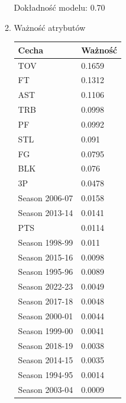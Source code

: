 \documentclass{article}
\begin{document}
\begin{enumerate}
\begin{enumerate}
        Dokładność modelu: 0.70
        \item Ważność atrybutów
        \begin{table}[H]
            \centering
            \begin{tabular}{|l|l|}
            \hline
            \textbf{Cecha} & \textbf{Ważność}  \\ \hline
            TOV & 0.1659 \\ \hline
            FT & 0.1312 \\ \hline
            AST & 0.1106 \\ \hline
            TRB & 0.0998 \\ \hline
            PF & 0.0992 \\ \hline
            STL & 0.091 \\ \hline
            FG & 0.0795 \\ \hline
            BLK & 0.076 \\ \hline
            3P & 0.0478 \\ \hline
            Season 2006-07 & 0.0158 \\ \hline
            Season 2013-14 & 0.0141 \\ \hline
            PTS & 0.0114 \\ \hline
            Season 1998-99 & 0.011 \\ \hline
            Season 2015-16 & 0.0098 \\ \hline
            Season 1995-96 & 0.0089 \\ \hline
            Season 2022-23 & 0.0049 \\ \hline
            Season 2017-18 & 0.0048 \\ \hline
            Season 2000-01 & 0.0044 \\ \hline
            Season 1999-00 & 0.0041 \\ \hline
            Season 2018-19 & 0.0038 \\ \hline
            Season 2014-15 & 0.0035 \\ \hline
            Season 1994-95 & 0.0014 \\ \hline
            Season 2003-04 & 0.0009 \\ \hline
            
            
            
            \end{tabular}
        \end{table}


\end{enumerate}
\end{enumerate}
\end{document}
